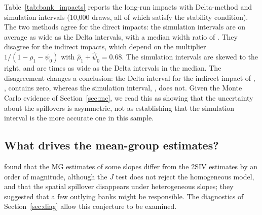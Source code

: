 Table~\ref{tab:bank_impacts} reports the long-run impacts with Delta-method
and simulation intervals (10{,}000 draws, all of which satisfy the stability
condition). The two methods agree for the direct impacts: the simulation
intervals are on average as wide as the Delta intervals, with a median width
ratio of \BankWidenDir. They disagree for the indirect impacts, which
depend on the multiplier $1/(1-\rho_1-\psi_0)$ with $\hat\rho_1+\hat\psi_0=0.68$.
The simulation intervals are skewed to the right, and are \BankWidenInd{}
times as wide as the Delta intervals in the median. The disagreement changes
a conclusion: the Delta interval for the indirect impact of ,
\BankSizeIndDelta, contains zero, whereas the simulation interval,
\BankSizeIndSim, does not. Given the Monte Carlo evidence of
Section~\ref{sec:mc}, we read this as showing that the uncertainty about
the spillovers is asymmetric, not as establishing that the simulation
interval is the more accurate one in this sample.

\begin{table}[t!]
\centering\scriptsize

\caption{Bank data: long-run average impacts with 95\% intervals from the
Delta method and from Krinsky--Robb simulation (10{,}000 draws).}
\label{tab:bank_impacts}
\end{table}

\subsection{What drives the mean-group estimates?}

\citet{Kripfganz+Sarafidis:2025} found that the MG estimates of some slopes
differ from the 2SIV estimates by an order of magnitude, although the $J$
test does not reject the homogeneous model, and that the spatial spillover
disappears under heterogeneous slopes; they suggested that a few outlying
banks might be responsible. The diagnostics of Section~\ref{sec:diag}
allow this conjecture to be examined.

\begin{table}[t!]
\centering\small

\caption{Bank data: the eight banks with the largest influence on the MG
estimates of the  and  slopes. ``Change in MG'' is
the change in the MG estimate from deleting the bank, in units of its
standard error.}
\label{tab:bank_influence}
\end{table}

\begin{table}[t!]
\centering\scriptsize

\caption{Bank data: MG estimates and robust summaries of the bank-specific
estimates, with 95\% intervals (normal for MG, bootstrap percentile with 999
resamples of banks for the others).}
\label{tab:bank_mg}
\end{table}

